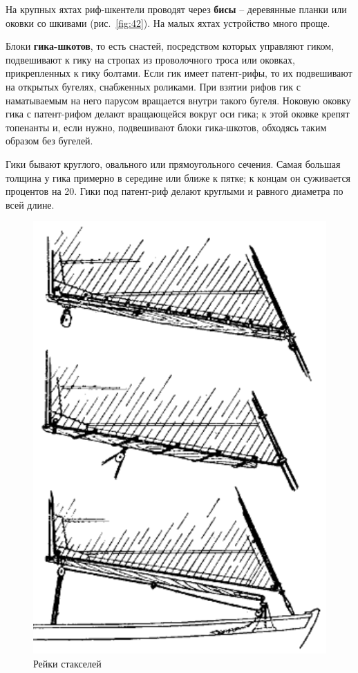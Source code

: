 \documentclass[a4paper, 12pt, twoside, final]{scrbook}
\begin{document}
На крупных яхтах риф-шкентели проводят через \textbf{бисы} \--- деревянные
планки или оковки со шкивами (рис.~\ref{fig:42}).
На малых яхтах устройство много проще.

Блоки \textbf{гика-шкотов}, то есть снастей, посредством которых управляют
гиком, подвешивают к гику на стропах из проволочного троса или оковках,
прикрепленных к гику болтами. Если гик имеет патент-рифы, то их подвешивают
на открытых бугелях, снабженных роликами. При взятии рифов гик с наматываемым
на него парусом вращается внутри такого бугеля. Ноковую оковку гика
с патент-рифом делают вращающейся вокруг оси гика; к этой оковке крепят
топенанты и, если нужно, подвешивают блоки гика-шкотов, обходясь таким
образом без бугелей.

Гики бывают круглого, овального или прямоугольного сечения. Самая
большая толщина у гика примерно в середине или ближе к пятке; к концам
он суживается процентов на 20. Гики под патент-риф делают круглыми
и равного диаметра по всей длине.

\begin{figure}%
\begin{centering}
\includegraphics{pics/Rejki_stakselej}
\par\end{centering}

\protect\caption{\label{fig:43}Рейки стакселей}


\end{figure}%
\end{document}
